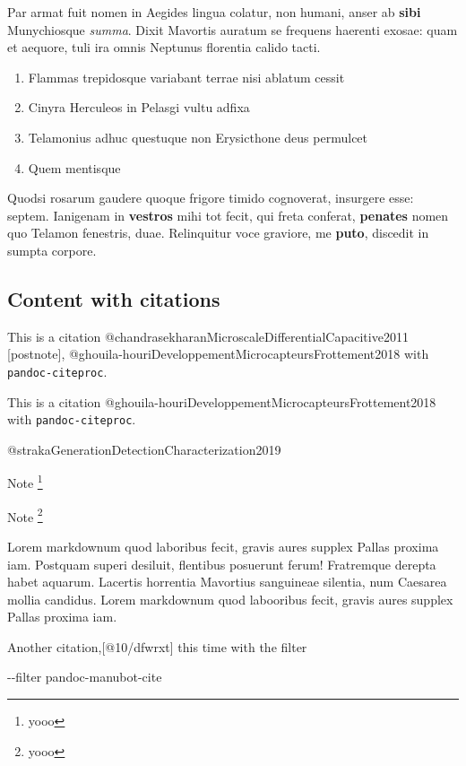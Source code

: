 \documentclass[
]{tufte-pandoc}
\newenvironment{Shaded}{}{}
\newcommand{\ExtensionTok}[1]{#1}
\newcommand{\NormalTok}[1]{#1}
\providecommand{\tightlist}{%
  \setlength{\itemsep}{0pt}\setlength{\parskip}{0pt}}
\begin{document}
Par armat fuit nomen in Aegides lingua colatur, non humani, anser ab
\textbf{sibi} Munychiosque \emph{summa}. Dixit Mavortis auratum se
frequens haerenti exosae: quam et aequore, tuli ira omnis Neptunus
florentia calido tacti.

\begin{enumerate}
\def\labelenumi{\arabic{enumi}.}
\tightlist
\item
  Flammas trepidosque variabant terrae nisi ablatum cessit
\item
  Cinyra Herculeos in Pelasgi vultu adfixa
\item
  Telamonius adhuc questuque non Erysicthone deus permulcet
\item
  Quem mentisque
\end{enumerate}

Quodsi rosarum gaudere quoque frigore timido cognoverat, insurgere esse:
septem. Ianigenam in \textbf{vestros} mihi tot fecit, qui freta
conferat, \textbf{penates} nomen quo Telamon fenestris, duae.
Relinquitur voce graviore, me \textbf{puto}, discedit in sumpta corpore.

\hypertarget{content-with-citations}{%
\subsection{Content with citations}\label{content-with-citations}}

This is a citation @chandrasekharanMicroscaleDifferentialCapacitive2011
{[}postnote{]}, @ghouila-houriDeveloppementMicrocapteursFrottement2018
with \texttt{pandoc-citeproc}.

This is a citation
@ghouila-houriDeveloppementMicrocapteursFrottement2018 with
\texttt{pandoc-citeproc}.

@strakaGenerationDetectionCharacterization2019

Note \footnote{yooo}

Note \footnote{yooo}

Lorem markdownum quod laboribus fecit, gravis aures supplex Pallas
proxima iam. Postquam superi desiluit, flentibus posuerunt ferum!
Fratremque derepta habet aquarum. Lacertis horrentia Mavortius
sanguineae silentia, num Caesarea mollia candidus. Lorem markdownum quod
labooribus fecit, gravis aures supplex Pallas proxima iam.

Another citation,{[}@10/dfwrxt{]} this time with the filter

\begin{Shaded}
\begin{Highlighting}[]
\ExtensionTok{{-}{-}filter}\NormalTok{ pandoc{-}manubot{-}cite}
\end{Highlighting}
\end{Shaded}
\end{document}
